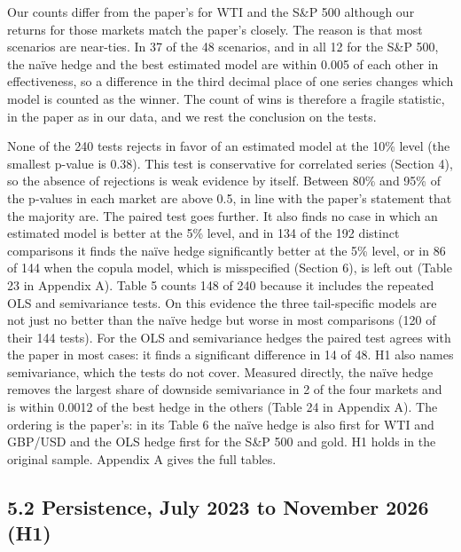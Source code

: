 \documentclass[11pt,letterpaper]{article}
\begin{document}
Our counts differ from the paper's for WTI and the S\&P 500 although our returns for those markets match the paper's closely. The reason is that most scenarios are near-ties. In 37 of the 48 scenarios, and in all 12 for the S\&P 500, the naïve hedge and the best estimated model are within 0.005 of each other in effectiveness, so a difference in the third decimal place of one series changes which model is counted as the winner. The count of wins is therefore a fragile statistic, in the paper as in our data, and we rest the conclusion on the tests.

None of the 240 tests rejects in favor of an estimated model at the 10\% level (the smallest p-value is 0.38). This test is conservative for correlated series (Section 4), so the absence of rejections is weak evidence by itself. Between 80\% and 95\% of the p-values in each market are above 0.5, in line with the paper's statement that the majority are. The paired test goes further. It also finds no case in which an estimated model is better at the 5\% level, and in 134 of the 192 distinct comparisons it finds the naïve hedge significantly better at the 5\% level, or in 86 of 144 when the copula model, which is misspecified (Section 6), is left out (Table 23 in Appendix A). Table 5 counts 148 of 240 because it includes the repeated OLS and semivariance tests. On this evidence the three tail-specific models are not just no better than the naïve hedge but worse in most comparisons (120 of their 144 tests). For the OLS and semivariance hedges the paired test agrees with the paper in most cases: it finds a significant difference in 14 of 48. H1 also names semivariance, which the tests do not cover. Measured directly, the naïve hedge removes the largest share of downside semivariance in 2 of the four markets and is within 0.0012 of the best hedge in the others (Table 24 in Appendix A). The ordering is the paper's: in its Table 6 the naïve hedge is also first for WTI and GBP/USD and the OLS hedge first for the S\&P 500 and gold. H1 holds in the original sample. Appendix A gives the full tables.

\subsection*{5.2 Persistence, July 2023 to November 2026 (H1)}
\end{document}
